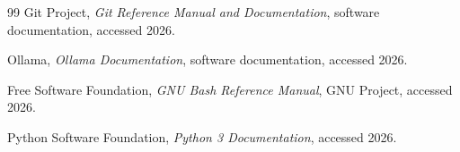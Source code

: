 \documentclass[11pt]{article}
\begin{document}
\begin{thebibliography}{99}
Git Project,
\textit{Git Reference Manual and Documentation},
software documentation,
accessed 2026.

Ollama,
\textit{Ollama Documentation},
software documentation,
accessed 2026.

Free Software Foundation,
\textit{GNU Bash Reference Manual},
GNU Project,
accessed 2026.

Python Software Foundation,
\textit{Python 3 Documentation},
accessed 2026.

\end{thebibliography}
\end{document}
